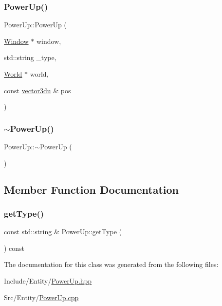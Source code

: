 \subsubsection{\texorpdfstring{PowerUp()}{PowerUp()}}
{\footnotesize\ttfamily Power\+Up\+::\+Power\+Up (\begin{DoxyParamCaption}\item[{\mbox{\hyperlink{class_window}{Window}} $\ast$}]{window,  }\item[{std\+::string}]{\+\_\+type,  }\item[{\mbox{\hyperlink{class_world}{World}} $\ast$}]{world,  }\item[{const \mbox{\hyperlink{_utility_8hpp_ac675fa2b6c79d0be47ae76e5d0ce38a8}{vector3du}} \&}]{pos }\end{DoxyParamCaption})}

\mbox{\label{class_power_up_a353053fe27c5a148a2fcd4f5f45e19af}} 
\subsubsection{\texorpdfstring{$\sim$PowerUp()}{~PowerUp()}}
{\footnotesize\ttfamily Power\+Up\+::$\sim$\+Power\+Up (\begin{DoxyParamCaption}{ }\end{DoxyParamCaption})\hspace{0.3cm}{\ttfamily [default]}}



\subsection{Member Function Documentation}
\mbox{\label{class_power_up_a88cb880f43bd244bd5d9f236d9b13aed}} 
\subsubsection{\texorpdfstring{getType()}{getType()}}
{\footnotesize\ttfamily const std\+::string \& Power\+Up\+::get\+Type (\begin{DoxyParamCaption}{ }\end{DoxyParamCaption}) const}



The documentation for this class was generated from the following files\+:\begin{DoxyCompactItemize}
\item 
Include/\+Entity/\mbox{\hyperlink{_power_up_8hpp}{Power\+Up.\+hpp}}\item 
Src/\+Entity/\mbox{\hyperlink{_power_up_8cpp}{Power\+Up.\+cpp}}\end{DoxyCompactItemize}
